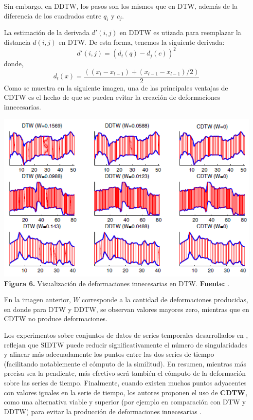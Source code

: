 Sin embargo, en DDTW, los pasos son los mismos que en DTW, adem\'as de la diferencia de los cuadrados entre $q_i$ y $c_j$.\par
La estimaci\'on de la derivada $d'(i,j)$ en DDTW es utizada para reemplazar la distancia $d(i,j)$ en DTW. De esta forma, tenemos la siguiente derivada:
\begin{equation}
d'(i,j) = (d_i(q) - d_j(c))^2
\end{equation}
donde, 
\begin{equation}
d_l(x) = \frac{((x_l - x_{l-1}) + (x_{l-1} - x_{l-1})/2)}{2}
\end{equation}
Como se muestra en la siguiente imagen, una de las principales ventajas de CDTW es el hecho de que se pueden evitar la creaci\'on de deformaciones innecesarias.
\begin{center}
\includegraphics[scale=0.8]{cdtw.png}\\
\vspace*{10pt}
\footnotesize{\textbf{Figura 6.} Visualizaci\'on de deformaciones innecesarias en DTW.} \textbf{Fuente:} \cite{DTWcubicsplineinterpolation}.
\end{center}
En la imagen anterior, $W$ corresponde a la cantidad de deformaciones producidas, en donde para DTW y DDTW, se observan valores mayores zero, mientras que en CDTW no produce deformaciones.\par
Los experimentos sobre conjuntos de datos de series temporales desarrollados en \cite{DTWcubicsplineinterpolation}, reflejan que SIDTW puede reducir significativamente el n\'umero de singularidades y alinear m\'as adecuadamente los puntos entre las dos series de tiempo (facilitando notablemente el c\'omputo de la similitud). En resumen, mientras m\'as precisa sea la pendiente, m\'as efectivo ser\'a tambi\'en el c\'omputo de la deformaci\'on sobre las series de tiempo. Finalmente, cuando existen muchos puntos adyacentes con valores iguales en la serie de tiempo, los autores proponen el uso de \textbf{CDTW}, como una alternativa viable y superior (por ejemplo en comparaci\'on con DTW y DDTW) para evitar la producci\'on de deformaciones innecesarias 	\cite{DTWcubicsplineinterpolation}.
